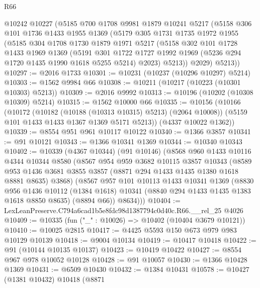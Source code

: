 \begin{lexlean}{R66}
\begin{coremodule}
    @10242
    @10227
    (@5185
      @700
      @1708
      @9981
      @1879
      @10241
      @5217
      (@5158
        @306
        @101
        @1736
        @1433
        @1955
        @1369
        (@5179
          @305
          @1731
          @1735
          @1972
          @1955
          (@5185
            @304
            @1708
            @1730
            @1879
            @1971
            @5217
            (@5158
              @302
              @101
              @1728
              @1433
              @1969
              @1369
              (@5191
                @301
                @1722
                @1727
                @1992
                @1969
                (@5236 @294 @1720 @1435 @1990 @1618 @5255 @5214)
                @2023)
              @5213))
          @2029)
        @5213))
@10297 := @2016 @1733
@10301 := @10231 (@10237 (@10296 @10297) @5214)
@10303 := @1562 @9984 @66
@10308 := @10211 (@10217 (@10223 (@10301 @10303) @5213))
@10309 := @2016 @9992
@10313 := @10196 (@10202 (@10308 @10309) @5214)
@10315 := @1562 @10000 @66
@10335 := @10156
    (@10166
      (@10172
        (@10182 (@10188 (@10313 @10315) @5213) (@2064 @10008))
        (@5159 @101 @1433 @1433 @1367 @1369 @5171 @5213))
      (@4337 @10022 @1362))
@10339 := @8554 @951 @961 @10117 @10122
@10340 := @1366 @3857
@10341 := @91 @10121
@10343 := @1366 @10341 @1369
@10344 := @10340 @10343
@10402 := @10339
    (@4367 @10344)
    (@91 @10146)
    (@8568
      @960
      @1433
      @10116
      @4344
      @10344
      @8580
      (@8567
        @954
        @959
        @3682
        @10115
        @3857
        @10343
        (@8589 @953 @1436 @3681 @3855 @3857 (@8871 @294 @1433 @1435 @1380 @1618 @8881 @8635) @3868)
        (@8567
          @957
          @101
          @10113
          @1433
          @10341
          @1369
          (@8830
            @956
            @1436
            @10112
            (@1384 @1618)
            @10341
            (@8840 @294 @1433 @1435 @1383 @1618 @8850 @8635)
            (@8894 @66))
          @8634)))
@10404 := LexLeanPreserve.C794a6cad1b5e8fdc98d1387794c0d40c.R66.__rel_25 @4026
@10409 := @10335 (fun ("_" : @10026) => @10402 (@10404 @3679 @10121))
@10410 := @10025 @2815
@10417 := @4425 @5593 @150 @673 @979 @983 @10129 @10139
@10418 := @9004 @10134
@10419 := @10417 @10418
@10422 := @91 (@10144 @10135 @10137)
@10423 := @10419 @10422
@10427 := @8554 @967 @978 @10052 @10128
@10428 := @91 @10057
@10430 := @1366 @10428 @1369
@10431 := @6509 @10430
@10432 := @1384 @10431
@10578 := @10427
    (@1381 @10432)
    @10418
    (@8871

\end{coremodule}
\end{lexlean}
